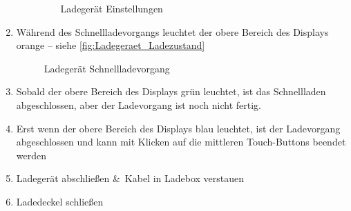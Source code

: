 \begin{enumerate}
\begin{enumerate}
        \begin{figure}[H]
            \centering
            \caption{Ladegerät Einstellungen \label{fig:Ladegeraet_Menueanzeige2}}
        \end{figure}
    \end{enumerate}
    \newpage
    \item Während des Schnellladevorgangs leuchtet der obere Bereich des Displays \\ orange -- siehe \autoref{fig:Ladegeraet_Ladezustand}
    \begin{figure}[H]
        \centering
        \caption{Ladegerät Schnellladevorgang \label{fig:Ladegeraet_Ladezustand}}
    \end{figure}
    \item Sobald der obere Bereich des Displays grün leuchtet, ist das Schnellladen abgeschlossen, aber der Ladevorgang ist noch nicht fertig.
    \item Erst wenn der obere Bereich des Displays blau leuchtet, ist der Ladevorgang abgeschlossen und kann mit Klicken auf die mittleren Touch-Buttons beendet werden
    \item Ladegerät abschließen \&\ Kabel in Ladebox verstauen
    \item Ladedeckel schließen
\end{enumerate}

